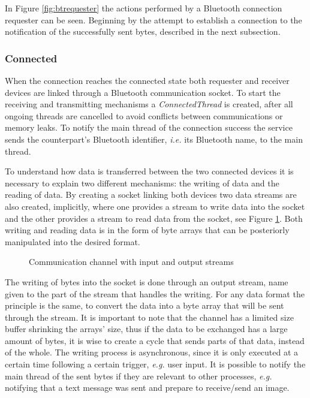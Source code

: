 In Figure \ref{fig:btrequester} the actions performed by a Bluetooth connection requester can be seen. Beginning by the attempt to establish a connection to the notification of the successfully sent bytes, described in the next subsection.

\subsubsection{Connected}
\label{subsubsec:connected}

When the connection reaches the connected state both requester and receiver devices are linked through a Bluetooth communication socket. To start the receiving and transmitting mechanisms a \textit{ConnectedThread} is created, after all ongoing threads are cancelled to avoid conflicts between communications or memory leaks. To notify the main thread of the connection success the service sends the counterpart's Bluetooth identifier, \textit{i.e.} its Bluetooth name, to the main thread.

To understand how data is transferred between the two connected devices it is necessary to explain two different mechanisms: the writing of data and the reading of data. By creating a socket linking both devices two data streams are also created, implicitly, where one provides a stream to write data into the socket and the other provides a stream to read data from the socket, see Figure \ref{fig:inoutstreams}. Both writing and reading data is in the form of byte arrays that can be posteriorly manipulated into the desired format.

\begin{figure}[ht]
	\noindent{}
	\caption{\label{fig:inoutstreams} Communication channel with input and output streams}
\end{figure}

The writing of bytes into the socket is done through an output stream, name given to the part of the stream that handles the writing. For any data format the principle is the same, to convert the data into a byte array that will be sent through the stream. It is important to note that the channel has a limited size buffer shrinking the arrays' size, thus if the data to be exchanged has a large amount of bytes, it is wise to create a cycle that sends parts of that data, instead of the whole. The writing process is asynchronous, since it is only executed at a certain time following a certain trigger, \textit{e.g.} user input. It is possible to notify the main thread of the sent bytes if they are relevant to other processes, \textit{e.g.} notifying that a text message was sent and prepare to receive/send an image.

